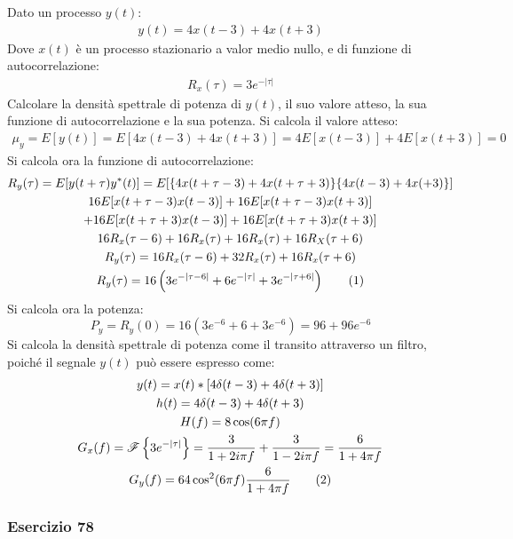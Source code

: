 \documentclass{article}
\newcommand{\tageq}{\tag{\stepcounter{equation}\theequation}}
\begin{document}
Dato un processo $y(t)$:
\begin{gather*}
    y(t)=4x(t-3)+4x(t+3)
\end{gather*}
Dove $x(t)$ è un processo stazionario a valor medio nullo, e di funzione di autocorrelazione:
\begin{gather*}
    R_x(\tau)=3e^{-|\tau|}
\end{gather*}
Calcolare la densità spettrale di potenza di $y(t)$, il suo valore atteso, la sua funzione di autocorrelazione e la sua potenza. 
Si calcola il valore atteso:
\begin{gather}
    \mu_y=E[y(t)]=E[4x(t-3)+4x(t+3)]=4E[x(t-3)]+4E[x(t+3)]=0
\end{gather}
Si calcola ora la funzione di autocorrelazione:
\begin{gather*}
    R_y(\tau)=E[y(t+\tau)y^*(t)]=E[\{4x(t+\tau-3)+4x(t+\tau+3)\}\{4x(t-3)+4x(+3)\}]\\
    16E[x(t+\tau-3)x(t-3)]+16E[x(t+\tau-3)x(t+3)]\\
    +16E[x(t+\tau+3)x(t-3)]+16E[x(t+\tau+3)x(t+3)]\\
    16R_x(\tau-6)+16R_x(\tau)+16R_x(\tau)+16R_X(\tau+6)\\
    R_y(\tau)=16R_x(\tau-6)+32R_x(\tau)+16R_x(\tau+6)\\
    R_y(\tau)=16\left(3e^{-|\tau-6|}+6e^{-|\tau|}+3e^{-|\tau+6|}\right)\tageq
\end{gather*}
Si calcola ora la potenza:
\begin{equation}
    P_y=R_y(0)=16(3e^{-6}+6+3e^{-6})=96+96e^{-6}
\end{equation}
Si calcola la densità spettrale di potenza come il transito attraverso un filtro, poiché il segnale $y(t)$ può essere espresso come:
\begin{gather*}
    y(t)=x(t)*[4\delta(t-3)+4\delta(t+3)]\\
    h(t)=4\delta(t-3)+4\delta(t+3)\\
    H(f)=\displaystyle8\cos(6\pi f)\\
    G_x(f)=\mathscr{F}\left\{3e^{-|\tau|}\right\}=\displaystyle\frac{3}{1+2i\pi f}+\frac{3}{1-2i\pi f}=\frac{6}{1+4\pi f}\\
    G_y(f)=64\cos^2(6\pi f)\displaystyle\frac{6}{1+4\pi f}\tageq
\end{gather*}

\subsubsection*{Esercizio 78}
\end{document}
